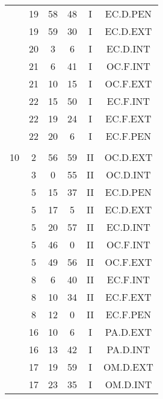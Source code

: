 \documentclass[12pt, a4paper]{article}
\begin{document}
\begin{multicols}{3}
{\begin{tabular}{c c c c c c}
	 	 	 	 & 19 & 58 & 48 & I & EC.D.PEN\\%
	 	 	 	 & 19 & 59 & 30 & I & EC.D.EXT\\%
	 	 	 	 & 20 & 3 & 6 & I & EC.D.INT\\%
	 	 	 	 & 21 & 6 & 41 & I & OC.F.INT\\%
	 	 	 	 & 21 & 10 & 15 & I & OC.F.EXT\\%
	 	 	 	 & 22 & 15 & 50 & I & EC.F.INT\\%
	 	 	 	 & 22 & 19 & 24 & I & EC.F.EXT\\%
	 	 	 	 & 22 & 20 & 6 & I & EC.F.PEN\\%
	 	 	 	 & & & & & \\%
	 	 	 	10 & 2 & 56 & 59 & II & OC.D.EXT\\%
	 	 	 	 & 3 & 0 & 55 & II & OC.D.INT\\%
	 	 	 	 & 5 & 15 & 37 & II & EC.D.PEN\\%
	 	 	 	 & 5 & 17 & 5 & II & EC.D.EXT\\%
	 	 	 	 & 5 & 20 & 57 & II & EC.D.INT\\%
	 	 	 	 & 5 & 46 & 0 & II & OC.F.INT\\%
	 	 	 	 & 5 & 49 & 56 & II & OC.F.EXT\\%
	 	 	 	 & 8 & 6 & 40 & II & EC.F.INT\\%
	 	 	 	 & 8 & 10 & 34 & II & EC.F.EXT\\%
	 	 	 	 & 8 & 12 & 0 & II & EC.F.PEN\\%
	 	 	 	 & 16 & 10 & 6 & I & PA.D.EXT\\%
	 	 	 	 & 16 & 13 & 42 & I & PA.D.INT\\%
	 	 	 	 & 17 & 19 & 59 & I & OM.D.EXT\\%
	 	 	 	 & 17 & 23 & 35 & I & OM.D.INT\\%

\end{tabular}}
\end{multicols}
\end{document}
